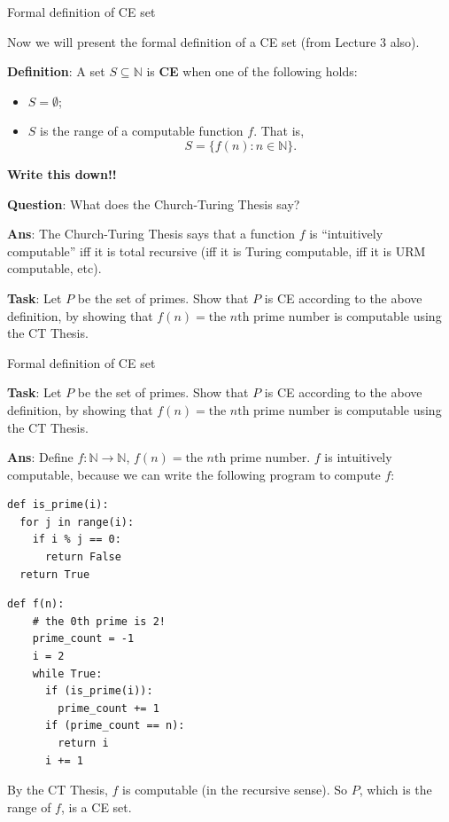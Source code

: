 \documentclass{beamer}
\newcommand{\N}{\mathbb N}
\begin{document}
\begin{frame}{Formal definition of CE set}

Now we will present the formal definition of a CE set (from Lecture 3 also).

\textbf{Definition}: A set $S \subseteq \N$ is \textbf{CE} when one of the following holds:
\begin{itemize}
    \item $S = \emptyset$;
    \item $S$ is the range of a computable function $f$. That is,
    $$S = \{f(n): n \in \N\}.$$
\end{itemize}

\textbf{Write this down!!}

\pause

\textbf{Question}: What does the Church-Turing Thesis say?

\pause

\textbf{Ans}: The Church-Turing Thesis says that a function $f$ is ``intuitively computable'' iff it is total recursive (iff it is Turing computable, iff it is URM computable, etc).

\pause

\textbf{Task}: Let $P$ be the set of primes. Show that $P$ is CE according to the above definition, by showing that $f(n) = \text{the $n$th prime number}$ is computable using the CT Thesis.

\end{frame}

\begin{frame}[fragile]{Formal definition of CE set}

\textbf{Task}: Let $P$ be the set of primes. Show that $P$ is CE according to the above definition, by showing that $f(n) = \text{the $n$th prime number}$ is computable using the CT Thesis.

\vspace{2mm}

\textbf{Ans}: Define $f: \N \to \N$, $f(n) = \text{the $n$th prime number}$. $f$ is intuitively computable, because we can write the following program to compute $f$:

\begin{minipage}{0.36\textwidth}
\begin{verbatim}
def is_prime(i):
  for j in range(i):
    if i % j == 0:
      return False
  return True
\end{verbatim}
\end{minipage}
\begin{minipage}{0.36\textwidth}
\begin{verbatim}
def f(n):
    # the 0th prime is 2!
    prime_count = -1
    i = 2
    while True:
      if (is_prime(i)):
        prime_count += 1
      if (prime_count == n):
        return i
      i += 1
\end{verbatim}
\end{minipage}

By the CT Thesis, $f$ is computable (in the recursive sense). So $P$, which is the range of $f$, is a CE set.

\end{frame}
\end{document}
